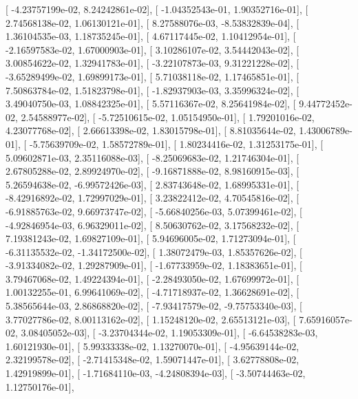 \documentclass{article}
\begin{document}
       [ -4.23757199e-02,   8.24242861e-02],
       [ -1.04352543e-01,   1.90352716e-01],
       [  2.74568138e-02,   1.06130121e-01],
       [  8.27588076e-03,  -8.53832839e-04],
       [  1.36104535e-03,   1.18735245e-01],
       [  4.67117445e-02,   1.10412954e-01],
       [ -2.16597583e-02,   1.67000903e-01],
       [  3.10286107e-02,   3.54442043e-02],
       [  3.00854622e-02,   1.32941783e-01],
       [ -3.22107873e-03,   9.31221228e-02],
       [ -3.65289499e-02,   1.69899173e-01],
       [  5.71038118e-02,   1.17465851e-01],
       [  7.50863784e-02,   1.51823798e-01],
       [ -1.82937903e-03,   3.35996324e-02],
       [  3.49040750e-03,   1.08842325e-01],
       [  5.57116367e-02,   8.25641984e-02],
       [  9.44772452e-02,   2.54588977e-02],
       [ -5.72510615e-02,   1.05154950e-01],
       [  1.79201016e-02,   4.23077768e-02],
       [  2.66613398e-02,   1.83015798e-01],
       [  8.81035644e-02,   1.43006789e-01],
       [ -5.75639709e-02,   1.58572789e-01],
       [  1.80234416e-02,   1.31253175e-01],
       [  5.09602871e-03,   2.35116088e-03],
       [ -8.25069683e-02,   1.21746304e-01],
       [  2.67805288e-02,   2.89924970e-02],
       [ -9.16871888e-02,   8.98160915e-03],
       [  5.26594638e-02,  -6.99572426e-03],
       [  2.83743648e-02,   1.68995331e-01],
       [ -8.42916892e-02,   1.72997029e-01],
       [  3.23822412e-02,   4.70545816e-02],
       [ -6.91885763e-02,   9.66973747e-02],
       [ -5.66840256e-03,   5.07399461e-02],
       [ -4.92846954e-03,   6.96329011e-02],
       [  8.50630762e-02,   3.17568232e-02],
       [  7.19381243e-02,   1.69827109e-01],
       [  5.94696005e-02,   1.71273094e-01],
       [ -6.31135532e-02,  -1.34172500e-02],
       [  1.38072479e-03,   1.85357626e-02],
       [ -3.91334082e-02,   1.29287909e-01],
       [ -1.67733959e-02,   1.18383651e-01],
       [  3.79467068e-02,   1.49224394e-01],
       [ -2.28493050e-02,   1.67699972e-01],
       [  1.00132255e-01,   6.99641069e-02],
       [ -4.71718937e-02,   1.36628691e-02],
       [  5.38565644e-03,   2.86868820e-02],
       [ -7.93417579e-02,  -9.75753340e-03],
       [  3.77027786e-02,   8.00113162e-02],
       [  1.15248120e-02,   2.65513121e-03],
       [  7.65916057e-02,   3.08405052e-03],
       [ -3.23704344e-02,   1.19053309e-01],
       [ -6.64538283e-03,   1.60121930e-01],
       [  5.99333338e-02,   1.13270070e-01],
       [ -4.95639144e-02,   2.32199578e-02],
       [ -2.71415348e-02,   1.59071447e-01],
       [  3.62778808e-02,   1.42919899e-01],
       [ -1.71684110e-03,  -4.24808394e-03],
       [ -3.50744463e-02,   1.12750176e-01],
\end{document}
